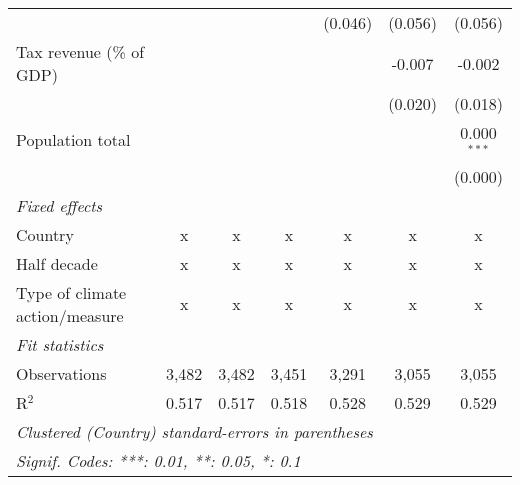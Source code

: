 \begin{tabular}{lcccccc}
                                                     &              &               &               & (0.046)       & (0.056)       & (0.056)\\   
   Tax revenue (\% of GDP)                           &              &               &               &               & -0.007        & -0.002\\   
                                                     &              &               &               &               & (0.020)       & (0.018)\\   
   Population total                                  &              &               &               &               &               & 0.000$^{***}$\\   
                                                     &              &               &               &               &               & (0.000)\\   
   \emph{Fixed effects}\\
   Country                                           & x            & x             & x             & x             & x             & x\\  
   Half decade                                       & x            & x             & x             & x             & x             & x\\  
   Type of climate action/measure                    & x            & x             & x             & x             & x             & x\\  
   \midrule \emph{Fit statistics}\\
   Observations                                      & 3,482        & 3,482         & 3,451         & 3,291         & 3,055         & 3,055\\  
   R$^2$                                             & 0.517        & 0.517         & 0.518         & 0.528         & 0.529         & 0.529\\  
   \midrule
   \multicolumn{7}{l}{\emph{Clustered (Country) standard-errors in parentheses}}\\
   \multicolumn{7}{l}{\emph{Signif. Codes: ***: 0.01, **: 0.05, *: 0.1}}\\
\end{tabular}
\par\endgroup


